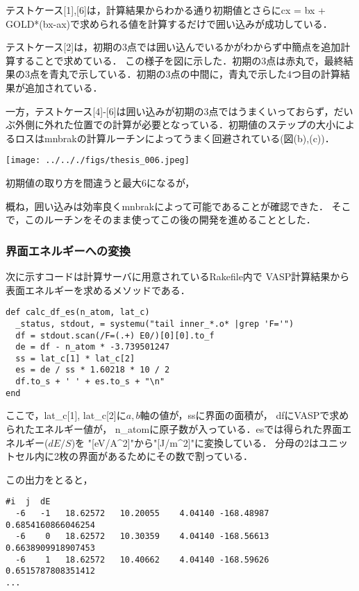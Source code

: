 \documentclass[11pt,dvipdfmx]{jsarticle}
\begin{document}
テストケース{[}1{]},{[}6{]}は，計算結果からわかる通り初期値とさらにcx =
bx + GOLD*(bx-ax)で求められる値を計算するだけで囲い込みが成功している．

テストケース{[}2{]}は，初期の3点では囲い込んでいるかがわからず中簡点を追加計算することで求めている．
この様子を図に示した．初期の3点は赤丸で，最終結果の3点を青丸で示している．初期の3点の中間に，青丸で示した4つ目の計算結果が追加されている．

一方，テストケース{[}4{]}-{[}6{]}は囲い込みが初期の3点ではうまくいっておらず，だいぶ外側に外れた位置での計算が必要となっている．初期値のステップの大小によるロスはmnbrakの計算ルーチンによってうまく回避されている(図(b),(c))．
\begin{center}
\texttt{[image: ../.././figs/thesis\_006.jpeg]}
\end{center}
初期値の取り方を間違うと最大6になるが，

\label{fig:}
概ね，囲い込みは効率良くmnbrakによって可能であることが確認できた．
そこで，このルーチンをそのまま使ってこの後の開発を進めることとした．

    \subsubsection{界面エネルギーへの変換}\label{ux754cux9762ux30a8ux30cdux30ebux30aeux30fcux3078ux306eux5909ux63db}

次に示すコードは計算サーバに用意されているRakefile内で
VASP計算結果から表面エネルギーを求めるメソッドである．

\begin{verbatim}
def calc_df_es(n_atom, lat_c)
  _status, stdout, = systemu("tail inner_*.o* |grep 'F='")
  df = stdout.scan(/F=(.+) E0/)[0][0].to_f
  de = df - n_atom * -3.739501247
  ss = lat_c[1] * lat_c[2]
  es = de / ss * 1.60218 * 10 / 2
  df.to_s + ' ' + es.to_s + "\n"
end
\end{verbatim}

ここで，lat\_c{[}1{]},
lat\_c{[}2{]}に\(a,b\)軸の値が，ssに界面の面積が，
dfにVASPで求められたエネルギー値が，
n\_atomに原子数が入っている．esでは得られた界面エネルギー(\(dE/S\))を
"{[}eV/A\^{}2{]}"から"{[}J/m\^{}2{]}"に変換している．
分母の2はユニットセル内に2枚の界面があるためにその数で割っている．

この出力をとると，

\begin{verbatim}
#i  j  dE  
  -6   -1   18.62572   10.20055    4.04140 -168.48987 0.6854160866046254
  -6    0   18.62572   10.30359    4.04140 -168.56613 0.6638909918907453
  -6    1   18.62572   10.40662    4.04140 -168.59626 0.6515787808351412
...
\end{verbatim}
\end{document}
